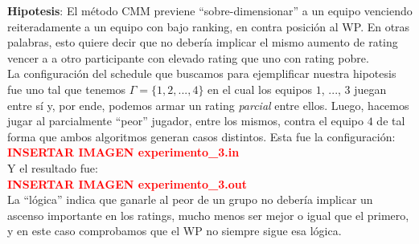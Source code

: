 \textbf{Hipotesis}: El m\'etodo CMM previene ``sobre-dimensionar'' a un equipo venciendo reiteradamente a un equipo con bajo ranking, en contra posici\'on al WP. En otras palabras, esto quiere decir que no deber\'ia implicar el mismo aumento de rating vencer a a otro participante con elevado rating que uno con rating pobre. \\

La configuraci\'on del schedule que buscamos para ejemplificar nuestra hipotesis fue uno tal que tenemos $\Gamma = \{1,2,...,4\}$ en el cual los equipos $1$, ..., $3$ juegan entre s\'i y, por ende, podemos armar un rating \textit{parcial} entre ellos. Luego, hacemos jugar al parcialmente ``peor'' jugador, entre los mismos, contra el equipo $4$ de tal forma que ambos algoritmos generan casos distintos. Esta fue la configuraci\'on: \\

\textcolor{red}{\textbf{INSERTAR IMAGEN experimento_3.in}} \\

Y el resultado fue: \\

\textcolor{red}{\textbf{INSERTAR IMAGEN experimento_3.out}} \\

La ``l\'ogica'' indica que ganarle al peor de un grupo no deber\'ia implicar un ascenso importante en los ratings, mucho menos ser mejor o igual que el primero, y en este caso comprobamos que el WP no siempre sigue esa l\'ogica.


